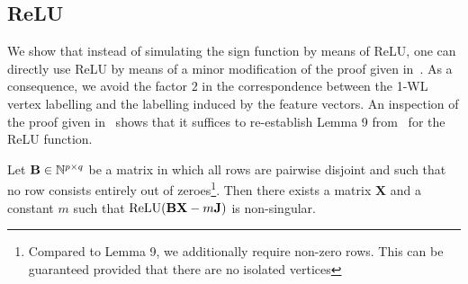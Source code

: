 \subsection{ReLU}\label{subsec:relu}
We show that instead of simulating the sign function by means of ReLU, one can directly
use ReLU by means of a minor modification of the proof given in~\cite{grohewl}. 
As a consequence, we avoid the factor $2$ in the correspondence between the 1-WL
vertex labelling and the labelling induced by the feature vectors.
An inspection of the proof given in~\cite{grohewl} shows that it suffices to re-establish Lemma 9 from~\cite{grohewl} for the ReLU function. \begin{lemma}\label{lem:relulemma9}
  Let
  $\mathbf{B}\in \mathbb{N}^{p\times q}$ be a matrix in which all
  rows are pairwise disjoint and such that no row consists entirely
  out of zeroes\footnote{Compared to Lemma 9,
 we additionally require non-zero rows. This can be guaranteed provided that there are no isolated vertices}.
  Then there exists a matrix $\mathbf{X}$ and a constant $m$
  such that $\text{\normalfont ReLU}(\mathbf{BX}-m\mathbf{J})$ is
  non-singular.
\end{lemma}
